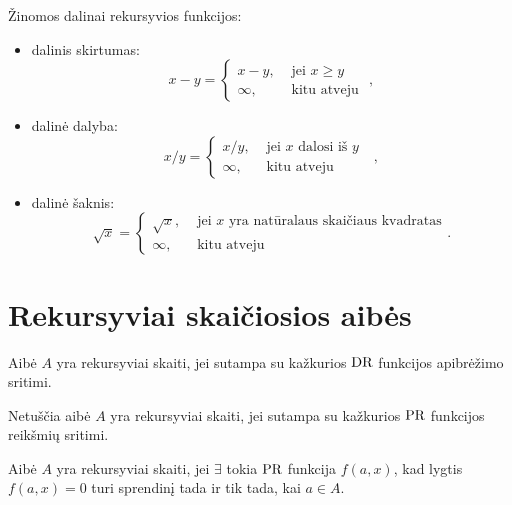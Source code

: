 \begin{note}
  Žinomos dalinai rekursyvios funkcijos:
  \begin{itemize}
    \item dalinis skirtumas:
      \[
      x - y =%
      \begin{cases}
        x - y, & \text{ jei } x \geq y \\
        \infty, & \text{ kitu atveju }
      \end{cases},
      \]
    \item dalinė dalyba:
      \[
      x / y =%
      \begin{cases}
        x / y, & \text{ jei $x$ dalosi iš $y$ }\\
        \infty, & \text{ kitu atveju }
      \end{cases},
      \]
    \item dalinė šaknis:
      \[
      \sqrt{x} =%
      \begin{cases}
        \sqrt{x}, & \text{ jei $x$ yra natūralaus skaičiaus kvadratas} \\
        \infty, & \text{ kitu atveju }
      \end{cases}.
      \]
  \end{itemize}
\end{note}

\section{Rekursyviai skaičiosios aibės}

\begin{defn}
  \label{rsadr}
  Aibė $A$ yra rekursyviai skaiti, jei sutampa su kažkurios $\mathop{\text{DR}}$ funkcijos
  apibrėžimo sritimi.
\end{defn}

\begin{defn}
  \label{rsapr}
  Netuščia aibė $A$ yra rekursyviai skaiti, jei sutampa su kažkurios
  $\mathop{\text{PR}}$ funkcijos reikšmių sritimi.
\end{defn}

\begin{defn}
  \label{rsalg}
  Aibė $A$ yra rekursyviai skaiti, jei $\exists$ tokia $\mathop{\text{PR}}$ funkcija
  $f(a,x)$, kad lygtis $f(a, x) = 0$ turi sprendinį tada ir tik tada, kai
  $a \in A$.
\end{defn}

